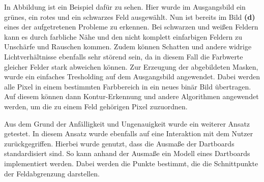 In Abbildung  ist ein Beispiel dafür zu sehen. Hier wurde im Ausgangsbild ein grünes, ein rotes und ein schwarzes Feld ausgewählt. Nun ist bereits im Bild \textbf{(d)} eines der aufgetretenen Probleme zu erkennen. Bei schwarzen und weißen Feldern kann es durch farbliche Nähe und den nicht komplett einfarbigen Feldern zu Unschärfe und Rauschen kommen. Zudem können Schatten und andere widrige Lichtverhältnisse ebenfalls sehr störend sein, da in diesem Fall die Farbwerte gleicher Felder stark abweichen können. 
Zur Erzeugung der abgebildeten Masken, wurde ein einfaches Tresholding auf dem Ausgangsbild angewendet. Dabei werden alle Pixel in einem bestimmten Farbbereich in ein neues binär Bild übertragen. Auf diesem können dann Kontur-Erkennung und andere Algorithmen angewendet werden, um die zu einem Feld gehörigen Pixel zuzuordnen.


Aus dem Grund der Anfälligkeit und Ungenauigkeit wurde ein weiterer Ansatz getestet.
In diesem Ansatz wurde ebenfalls auf eine Interaktion mit dem Nutzer zurückgegriffen.
Hierbei wurde genutzt, dass die Ausmaße der Dartboards standardisiert sind. So kann anhand der Ausmaße ein Modell eines Dartboards implementiert werden. Dabei werden die Punkte bestimmt, die die Schnittpunkte der Feldabgrenzung darstellen. 

